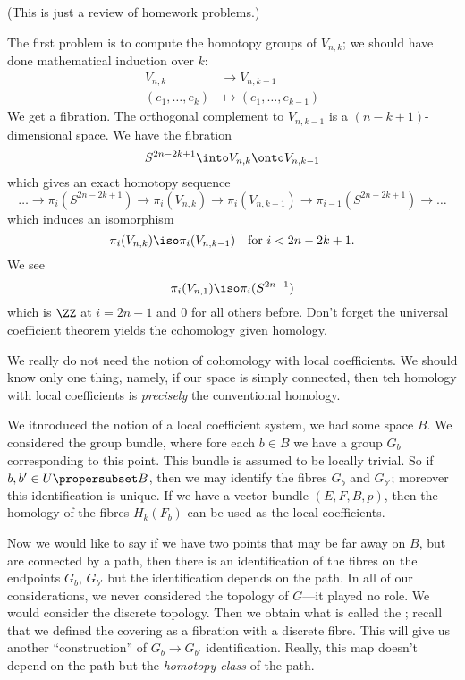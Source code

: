 (This is just a review of homework problems.)

The first problem is to compute the homotopy groups of $V_{n,k}$;
we should have done mathematical induction over $k$:
\begin{equation}
\begin{split}
V_{n,k} & \to V_{n,k-1}\\
(e_{1},\dots,e_{k}) & \mapsto (e_{1},\dots,e_{k-1})
\end{split}
\end{equation}
We get a fibration. The orthogonal complement to $V_{n,k-1}$ is a
$(n-k+1)$-dimensional space. We have the fibration
\begin{equation}
S^{2n-2k+1}\into V_{n,k}\onto V_{n,k-1}
\end{equation}
which gives an exact homotopy sequence
\begin{equation}
\dots\to\pi_{i}(S^{2n-2k+1})\to\pi_{i}(V_{n,k})\to\pi_{i}(V_{n,k-1})\to\pi_{i-1}(S^{2n-2k+1})\to\dots
\end{equation}
which induces an isomorphism 
\begin{equation}
\pi_{i}(V_{n,k})\iso\pi_{i}(V_{n,k-1})\quad\mbox{for }i<2n-2k+1.
\end{equation}
We see
\begin{equation}
\pi_{i}(V_{n,1})\iso\pi_{i}(S^{2n-1})
\end{equation}
which is $\ZZ$ at $i=2n-1$ and $0$ for all others before. Don't
forget the universal coefficient theorem yields the cohomology
given homology. 

We really do not need the notion of cohomology with local
coefficients. We should know only one thing, namely, if our space
is simply connected, then teh homology with local coefficients is
\emph{precisely} the conventional homology.

We itnroduced the notion of a local coefficient system, we had
some space $B$. We considered the group bundle, where fore each
$b\in B$ we have a group $G_{b}$ corresponding to this
point. This bundle is assumed to be locally trivial. So if
$b,b'\in U\propersubset B$, then we may identify the fibres
$G_{b}$ and $G_{b'}$; moreover this identification is unique. If
we have a vector bundle $(E,F,B,p)$, then the homology of the
fibres $H_{k}(F_{b})$ can be used as the local coefficients. 

Now we would like to say if we have two points that may be far
away on $B$, but are connected by a path, then there is an
identification of the fibres on the endpoints $G_{b}$, $G_{b'}$
but the identification depends on the path. In all of our
considerations, we never considered the topology of $G$---it
played no role. We would consider the discrete topology. Then we
obtain what is called the ; recall that we
defined the covering as a fibration with a discrete fibre. This
will give us another ``construction'' of $G_{b}\to G_{b'}$
identification. Really, this map doesn't depend on the path but
the \emph{homotopy class} of the path.

